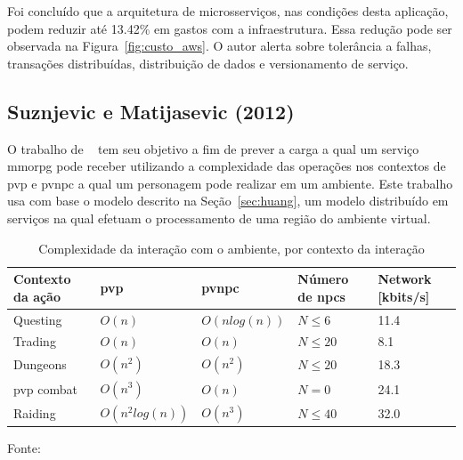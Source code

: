 Foi concluído que a arquitetura de microsserviços, nas condições desta aplicação, podem reduzir até 13.42\% em gastos com a infraestrutura.
%
Essa redução pode ser observada na Figura~\ref{fig:custo_aws}.
%
O autor alerta sobre tolerância a falhas, transações distribuídas, distribuição de dados e versionamento de serviço.


\subsection{Suznjevic e Matijasevic (2012)}



O trabalho de ~\cite{6374456} tem seu objetivo a fim de prever a carga a qual um serviço \ac{mmorpg} pode receber utilizando a complexidade das operações nos contextos de \ac{pvp} e \ac{pvnpc} a qual um personagem pode realizar em um ambiente.
%
Este trabalho usa com base o modelo descrito na Seção~\ref{sec:huang}, um modelo distribuído em serviços na qual efetuam o processamento de uma região do ambiente virtual.



\begin{table}[htb!]
\centering
\caption{Complexidade da interação com o ambiente, por contexto da interação}
\label{tab:complexidade}
\begin{tabular}{|l|l|l|l|l|}
\hline
Contexto da ação        & \ac{pvp}           & \ac{pvnpc}              & Número de \ac{npcs}    & Network {[}kbits/s{]} \\ \hline
Questing                & $O(n)$             & $O(n log(n))$           & $N \leq 6 $            & 11.4          \\ \hline
Trading                 & $O(n)$             & $O(n)$                  & $N \leq 20$            & 8.1           \\ \hline
Dungeons                & $O(n^2)$           & $O(n^2)$                & $N \leq 20$            & 18.3          \\ \hline
\ac{pvp} combat         & $O(n^3)$           & $O(n)$                  & $N = 0    $            & 24.1          \\ \hline
Raiding                 & $O(n^2 log(n))$    & $O(n^3)$                & $N \leq 40$            & 32.0          \\ \hline
\end{tabular}

Fonte:~\cite{6374456}
\end{table}



